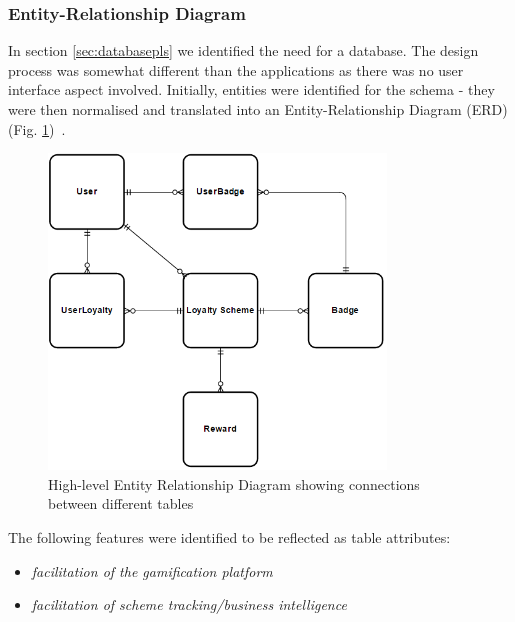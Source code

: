 \subsubsection{Entity-Relationship Diagram}
In section \ref{sec:databasepls} we identified the need for a database.
The design process was somewhat different than the applications as there was no user interface aspect involved. Initially, entities were identified for the schema - they were then normalised and translated into an Entity-Relationship Diagram (ERD)(Fig. \ref{fig:erd})~\cite{erd}.

\begin{figure}[H]
  \centering
    \includegraphics[width=0.8\textwidth]{img/erd.png}
      \caption{High-level Entity Relationship Diagram showing connections between different tables}
      \label{fig:erd}
\end{figure}

The following features were identified to be reflected as table attributes:
\begin{itemize}
  \item \textit{facilitation of the gamification platform}
  \item \textit{facilitation of scheme tracking/business intelligence}
\end{itemize}

\newpage
